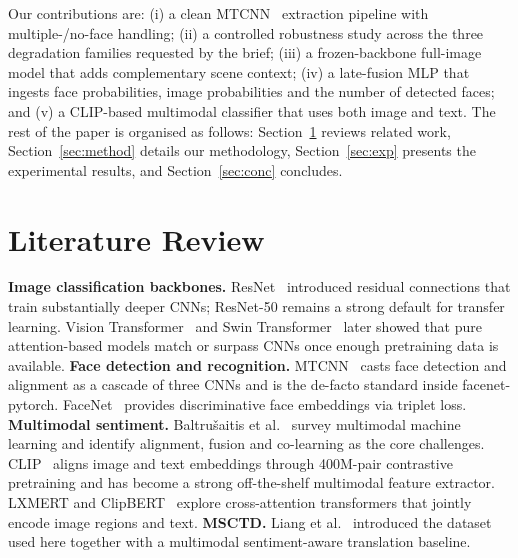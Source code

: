 \documentclass[conference]{IEEEtran}
\begin{document}
Our contributions are: (i) a clean MTCNN~\cite{mtcnn} extraction pipeline
with multiple-/no-face handling; (ii) a controlled robustness study
across the three degradation families requested by the brief; (iii) a
frozen-backbone full-image model that adds complementary scene context;
(iv) a late-fusion MLP that ingests face probabilities, image
probabilities and the number of detected faces; and (v) a CLIP-based
multimodal classifier that uses both image and text. The rest of the
paper is organised as follows: Section~\ref{sec:lit} reviews related
work, Section~\ref{sec:method} details our methodology,
Section~\ref{sec:exp} presents the experimental results, and
Section~\ref{sec:conc} concludes.

\section{Literature Review}\label{sec:lit}
\textbf{Image classification backbones.} ResNet~\cite{he2016deep}
introduced residual connections that train substantially deeper CNNs;
ResNet-50 remains a strong default for transfer learning. Vision
Transformer~\cite{dosovitskiy2020vit} and Swin Transformer~\cite{liu2021swin}
later showed that pure attention-based models match or surpass CNNs
once enough pretraining data is available.
\textbf{Face detection and recognition.} MTCNN~\cite{mtcnn} casts face
detection and alignment as a cascade of three CNNs and is the de-facto
standard inside facenet-pytorch. FaceNet~\cite{schroff2015facenet}
provides discriminative face embeddings via triplet loss.
\textbf{Multimodal sentiment.}
Baltru{\v s}aitis et al.~\cite{baltrusaitis2018multimodal} survey
multimodal machine learning and identify alignment, fusion and
co-learning as the core challenges. CLIP~\cite{radford2021clip} aligns
image and text embeddings through 400M-pair contrastive pretraining and
has become a strong off-the-shelf multimodal feature extractor. LXMERT
\cite{tan2019lxmert} and ClipBERT~\cite{lei2021clipbert} explore
cross-attention transformers that jointly encode image regions and
text. \textbf{MSCTD.} Liang et al.~\cite{msctd} introduced the dataset
used here together with a multimodal sentiment-aware translation
baseline.

\end{document}
